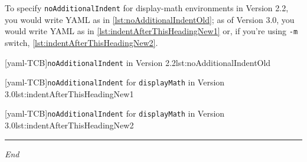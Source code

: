 	 To specify \texttt{noAdditionalIndent} for display-math environments in Version 2.2, you
	 would write YAML as in \cref{lst:noAdditionalIndentOld}; as of Version 3.0, you would
	 write YAML as in \cref{lst:indentAfterThisHeadingNew1} or, if you're using \texttt{-m}
	 switch, \cref{lst:indentAfterThisHeadingNew2}. 

	 \begin{minipage}{.45\textwidth}
		 [yaml-TCB]{\texttt{noAdditionalIndent} in Version 2.2}{lst:noAdditionalIndentOld}
	 \end{minipage}%
	 \hfill
	 \begin{minipage}{.45\textwidth}
		 [yaml-TCB]{\texttt{noAdditionalIndent} for \texttt{displayMath} in Version 3.0}{lst:indentAfterThisHeadingNew1}

		 [yaml-TCB]{\texttt{noAdditionalIndent} for \texttt{displayMath} in Version 3.0}{lst:indentAfterThisHeadingNew2}
	 \end{minipage}%

	 \mbox{}\hfill
	 \begin{minipage}{.25\textwidth}
		 \hrule

		 \hfill\itshape End\\\mbox{}\hfill\mbox{}

	 \end{minipage}
